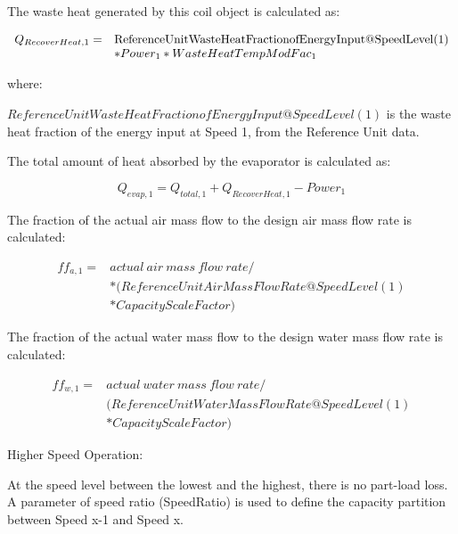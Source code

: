 The waste heat generated by this coil object is calculated as:

\begin{equation}
  \begin{array}{rl}
    Q_{RecoverHeat,1} =& \rm{ReferenceUnitWasteHeatFractionofEnergyInput@SpeedLevel(1)} \\
                       &* Power_1 * WasteHeatTempModFac_1
  \end{array}
\end{equation}

where:

\(ReferenceUnitWasteHeatFractionofEnergyInput@SpeedLevel\left( 1 \right)\) is the waste heat fraction of the energy input at Speed 1, from the Reference Unit data.

The total amount of heat absorbed by the evaporator is calculated as:

\begin{equation}
{{Q}_{evap,1}} = {Q_{total,1}} + {{Q}_{RecoverHeat,1}} - Powe{r_1}
\end{equation}

The fraction of the actual air mass flow to the design air mass flow rate is calculated:

\begin{equation}
\begin{array}{rl}
  ff_{a,1} =& actual~air~mass~flow~rate/ \\
  &*(ReferenceUnitAirMassFlowRate@SpeedLevel(1) \\
  &*CapacityScaleFactor)
\end{array}
\end{equation}

The fraction of the actual water mass flow to the design water mass flow rate is calculated:

\begin{equation}
\begin{array}{rl}
  ff_{w,1} =& actual~water~mass~flow~rate/ \\
  &(ReferenceUnitWaterMassFlowRate@SpeedLevel(1) \\
  &*CapacityScaleFactor)
\end{array}
\end{equation}

Higher Speed Operation:

At the speed level between the lowest and the highest, there is no part-load loss. A parameter of speed ratio (SpeedRatio) is used to define the capacity partition between Speed x-1 and Speed x.

